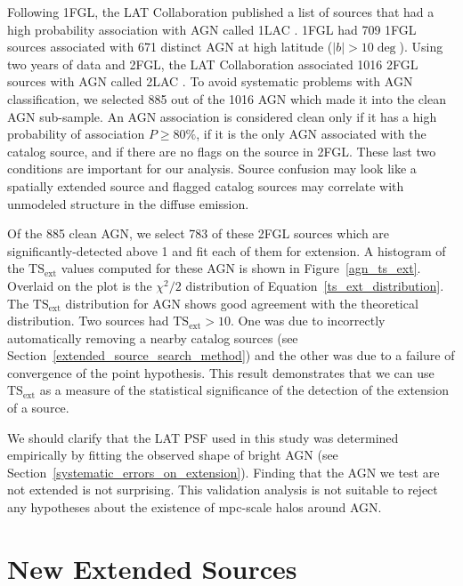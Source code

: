 \documentclass[12pt,preprint]{aastex}
\newcommand{\gev}{\text{GeV}\xspace}
\newcommand{\tsext}{{\ensuremath{\text{TS}_{\text{ext}}}}\xspace}
\begin{document}
Following 1FGL, the LAT Collaboration published a list 
of sources that
had a high probability association with AGN 
called 1LAC \citep{first_agn_cat}.
1FGL had 709 1FGL sources associated with 671 distinct AGN at high
latitude ($|b|>10\deg$).  
Using two years of data and 2FGL, the LAT Collaboration
associated 1016 2FGL sources
with AGN called 2LAC \citep{second_agn_cat}.
To avoid systematic problems with AGN classification, we
selected 885 out of the 1016 AGN which made it into the clean AGN sub-sample.  An AGN
association is considered clean only if it has a high probability
of association $P\ge 80\%$, if it is the only AGN associated with the
catalog source, and if there are no flags on the source in 2FGL. These
last two conditions are important for our analysis. Source
confusion may look like a spatially extended source and flagged catalog
sources may correlate with unmodeled structure in the diffuse emission.

Of the 885 clean AGN, we select 783 of these 2FGL sources which
are significantly-detected above 1 \gev and fit each of them for extension.
A histogram of the \tsext values computed for these AGN is
shown in Figure~\ref{agn_ts_ext}. Overlaid on the plot is the
$\chi^2/2$ distribution of Equation~\ref{ts_ext_distribution}.
The \tsext distribution for AGN shows good agreement with the
theoretical distribution.  Two sources had $\tsext>10$.  One was due
to incorrectly automatically removing a nearby catalog sources (see
Section~\ref{extended_source_search_method}) and the other was due to a
failure of convergence of the point hypothesis.  This result demonstrates
that we can use \tsext as a measure of the statistical significance of
the detection of the extension of a source.

We should clarify that the LAT PSF used in this study was determined
empirically by fitting the observed shape of bright AGN (see
Section~\ref{systematic_errors_on_extension}). Finding that the AGN we
test are not extended is not surprising.  This validation analysis is
not suitable to reject any hypotheses about the existence of mpc-scale
halos around AGN.

\section{New Extended Sources}
\label{new_ext_srcs_section}

\end{document}
